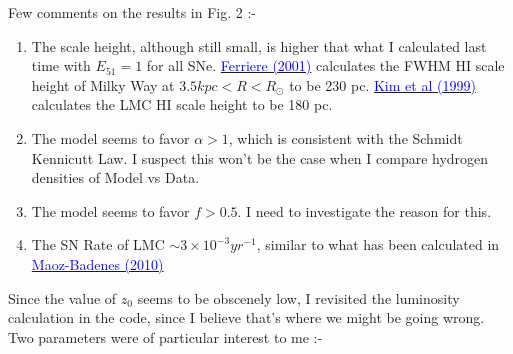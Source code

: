 \documentclass[10pt,a4paper]{article}
\begin{document}
Few comments on the results in Fig. 2 :-
\begin{enumerate}
\item The scale height, although still small, is higher that what I calculated last time with $E_{51} = 1$ for all SNe. \href{http://journals.aps.org/rmp/abstract/10.1103/RevModPhys.73.1031}{\textcolor{blue}{Ferriere (2001)}} calculates the FWHM HI scale height of Milky Way at $3.5 kpc < R < R_{\odot}$ to be 230 pc. \href{http://adsabs.harvard.edu/abs/1999AJ....118.2797K}{\textcolor{blue}{Kim et al (1999)}} calculates the LMC HI scale height to be 180 pc.
\item The model seems to favor $\alpha > 1$, which is consistent with the Schmidt Kennicutt Law. I suspect this won't be the case when I compare hydrogen densities of Model vs Data.
\item The model seems to favor $f>0.5$. I need to investigate the reason for this.
\item The SN Rate of LMC $\sim 3 \times 10^{-3} yr^{-1}$, similar to what has been calculated in \href{http://adsabs.harvard.edu/abs/2010MNRAS.407.1314M}{\textcolor{blue}{Maoz-Badenes (2010)}}\\
\end{enumerate}
Since the value of $z_0$ seems to be obscenely low, I revisited the luminosity calculation in the code, since I believe that's where we might be going wrong. Two parameters were of particular interest to me :-
\end{document}
